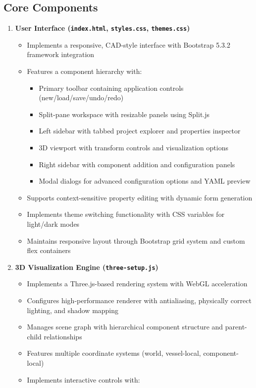 \documentclass[
  letterpaper,
  DIV=11,
  numbers=noendperiod]{scrreprt}
\providecommand{\tightlist}{%
  \setlength{\itemsep}{0pt}\setlength{\parskip}{0pt}}\usepackage{longtable,booktabs,array}
\begin{document}
\subsection*{Core Components}\label{core-components}

\begin{enumerate}
\def\labelenumi{\arabic{enumi}.}
\tightlist
\item
  \textbf{User Interface (\texttt{index.html}, \texttt{styles.css},
  \texttt{themes.css})}

  \begin{itemize}
  \tightlist
  \item
    Implements a responsive, CAD-style interface with Bootstrap 5.3.2
    framework integration
  \item
    Features a component hierarchy with:

    \begin{itemize}
    \tightlist
    \item
      Primary toolbar containing application controls
      (new/load/save/undo/redo)
    \item
      Split-pane workspace with resizable panels using Split.js
    \item
      Left sidebar with tabbed project explorer and properties inspector
    \item
      3D viewport with transform controls and visualization options
    \item
      Right sidebar with component addition and configuration panels
    \item
      Modal dialogs for advanced configuration options and YAML preview
    \end{itemize}
  \item
    Supports context-sensitive property editing with dynamic form
    generation
  \item
    Implements theme switching functionality with CSS variables for
    light/dark modes
  \item
    Maintains responsive layout through Bootstrap grid system and custom
    flex containers
  \end{itemize}
\item
  \textbf{3D Visualization Engine (\texttt{three-setup.js})}

  \begin{itemize}
  \tightlist
  \item
    Implements a Three.js-based rendering system with WebGL acceleration
  \item
    Configures high-performance renderer with antialiasing, physically
    correct lighting, and shadow mapping
  \item
    Manages scene graph with hierarchical component structure and
    parent-child relationships
  \item
    Features multiple coordinate systems (world, vessel-local,
    component-local)
  \item
    Implements interactive controls with:


\end{itemize}
\end{enumerate}
\end{document}
